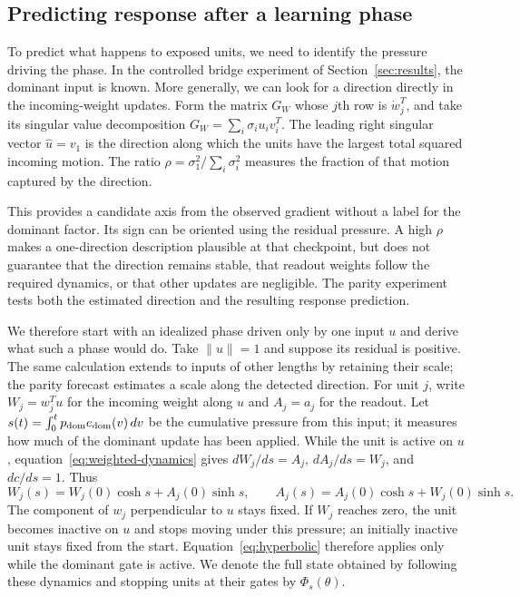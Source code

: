 \documentclass[11pt,a4paper]{article}
\begin{document}
\subsection{Predicting response after a learning phase}

To predict what happens to exposed units, we need to identify the pressure driving the phase. In the controlled bridge experiment of Section~\ref{sec:results}, the dominant input is known. More generally, we can look for a direction directly in the incoming-weight updates. Form the matrix $G_W$ whose $j$th row is $\dot w_j^T$, and take its singular value decomposition $G_W=\sum_i\sigma_i u_i v_i^T$. The leading right singular vector $\hat u=v_1$ is the direction along which the units have the largest total squared incoming motion. The ratio $\rho=\sigma_1^2/\sum_i\sigma_i^2$ measures the fraction of that motion captured by the direction.

This provides a candidate axis from the observed gradient without a label for the dominant factor. Its sign can be oriented using the residual pressure. A high $\rho$ makes a one-direction description plausible at that checkpoint, but does not guarantee that the direction remains stable, that readout weights follow the required dynamics, or that other updates are negligible. The parity experiment tests both the estimated direction and the resulting response prediction.

We therefore start with an idealized phase driven only by one input $u$ and derive what such a phase would do. Take $\|u\|=1$ and suppose its residual is positive. The same calculation extends to inputs of other lengths by retaining their scale; the parity forecast estimates a scale along the detected direction. For unit $j$, write $W_j=w_j^Tu$ for the incoming weight along $u$ and $A_j=a_j$ for the readout. Let $s(t)=\int_0^t p_{\rm dom}e_{\rm dom}(v)\,dv$ be the cumulative pressure from this input; it measures how much of the dominant update has been applied. While the unit is active on $u$, equation~\eqref{eq:weighted-dynamics} gives $dW_j/ds=A_j$, $dA_j/ds=W_j$, and $dc/ds=1$. Thus
\begin{equation}
 W_j(s)=W_j(0)\cosh s+A_j(0)\sinh s,\qquad
 A_j(s)=A_j(0)\cosh s+W_j(0)\sinh s.
 \label{eq:hyperbolic}
\end{equation}
The component of $w_j$ perpendicular to $u$ stays fixed. If $W_j$ reaches zero, the unit becomes inactive on $u$ and stops moving under this pressure; an initially inactive unit stays fixed from the start. Equation~\eqref{eq:hyperbolic} therefore applies only while the dominant gate is active. We denote the full state obtained by following these dynamics and stopping units at their gates by $\Phi_s(\theta)$.
\end{document}
